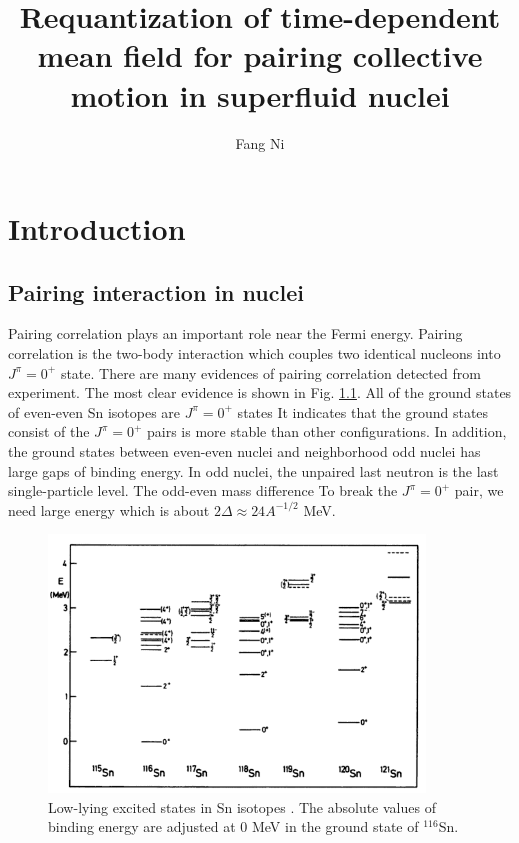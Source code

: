 \documentclass[11pt]{book} %
\title{Requantization of time-dependent mean field
 for pairing collective motion in superfluid nuclei}
\author{Fang Ni}
\begin{document}
\maketitle

\tableofcontents

\chapter{Introduction}

\section{Pairing interaction in nuclei}

Pairing correlation plays an important role near the Fermi energy. Pairing correlation is the two-body interaction which couples two identical nucleons into $J^{\pi}=0^+$ state. There are many evidences of pairing correlation detected from experiment. The most clear evidence is shown in Fig. \ref{Sn_isotope}. All of the ground states of even-even Sn isotopes are $J^{\pi}=0^+$ states  It indicates that the ground states consist of the $J^{\pi}=0^+$ pairs is more stable than other configurations. In addition, the ground states between even-even nuclei and neighborhood odd nuclei has large gaps of binding energy. In odd nuclei, the unpaired last neutron is the last single-particle level. The odd-even mass difference  To break the $J^{\pi}=0^+$ pair, we need large energy which is about $2\Delta \approx 24A^{-1/2}$ MeV.
\begin{figure}[htbp]
 \begin{center}
    \includegraphics[width=100mm, bb=0 0 400 300]{images/Sn_isotope.png}
 \end{center}
  \caption{Low-lying excited states in Sn isotopes \cite{}. The absolute values of binding energy are adjusted at 0 MeV in the ground state of ${}^{116}$Sn.}
  \label{Sn_isotope}
\end{figure}
\end{document}
